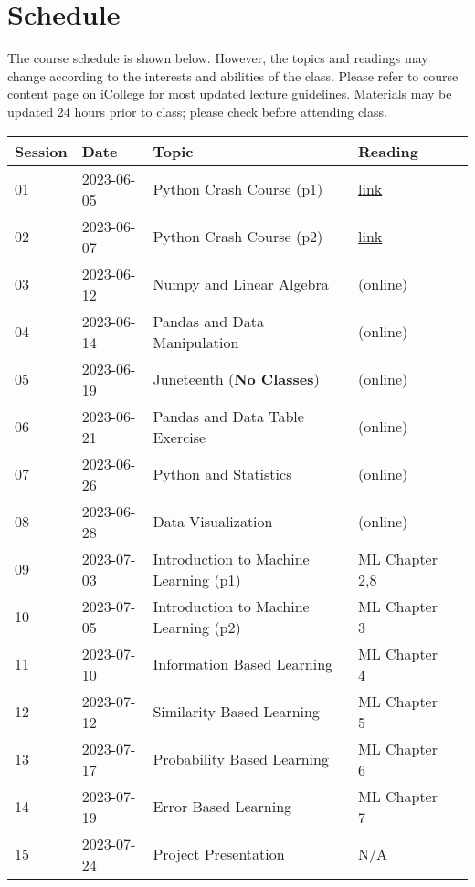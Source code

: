 \documentclass{article}
\begin{document}
\section{Schedule}
The course schedule is shown below. However, the topics and readings may change according to the interests and abilities of the class. Please refer to course content page on \href{https://gastate.view.usg.edu/d2l/home/2822689}{iCollege} for most updated lecture guidelines.  Materials may be updated 24 hours prior to class; please check before attending class.

\begin{center}
\begin{tabular}{lllll}
\hline
Session & Date  & Topic                                 & Reading \\
\hline
01       & 2023-06-05 & Python Crash Course (p1)              & \href{https://github.com/xiangshiyin/data-programming-with-python/tree/main/2023-summmer/2023-06-05}{link}\\
02       & 2023-06-07 & Python Crash Course (p2)              & \href{https://github.com/xiangshiyin/data-programming-with-python/tree/main/2023-summmer/2023-06-07}{link}\\
03       & 2023-06-12 & Numpy and Linear Algebra              & (online)\\
04       & 2023-06-14 & Pandas and Data Manipulation          & (online)\\
05       & 2023-06-19 & Juneteenth (\textbf{No Classes})                & (online)\\
06       & 2023-06-21 & Pandas and Data Table Exercise                & (online)\\
07       & 2023-06-26 & Python and Statistics                & (online)\\
08       & 2023-06-28 & Data Visualization               & (online)\\
09       & 2023-07-03 & Introduction to Machine Learning (p1) & ML Chapter 2,8\\
10       & 2023-07-05 & Introduction to Machine Learning (p2) & ML Chapter 3\\
11       & 2023-07-10 & Information Based Learning             & ML Chapter 4\\
12       & 2023-07-12 & Similarity Based Learning            & ML Chapter 5\\
13       & 2023-07-17 & Probability Based Learning                  & ML Chapter 6\\
14       & 2023-07-19 & Error Based Learning                        & ML Chapter 7\\
15       & 2023-07-24 & Project Presentation                  &N/A\\
\hline        
\end{tabular}
\end{center}
\end{document}
